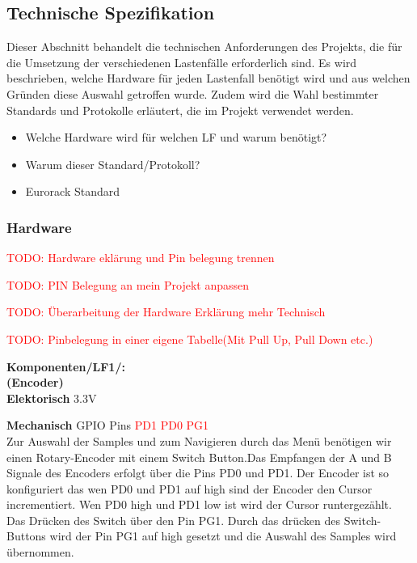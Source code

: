 \newpage
\subsection{Technische Spezifikation}
Dieser Abschnitt behandelt die technischen Anforderungen des Projekts, die für die Umsetzung der verschiedenen Lastenfälle erforderlich sind. Es wird beschrieben, welche Hardware für jeden Lastenfall benötigt wird und aus welchen Gründen diese Auswahl getroffen wurde. Zudem wird die Wahl bestimmter Standards und Protokolle erläutert, die im Projekt verwendet werden.

\begin{itemize}
    \item Welche Hardware wird für welchen LF und warum benötigt?
    \item Warum dieser Standard/Protokoll?
    \item Eurorack Standard
\end{itemize}


\subsubsection{Hardware}

\textcolor{red}{TODO: Hardware eklärung und Pin belegung trennen}

\textcolor{red}{TODO: PIN Belegung an mein Projekt anpassen}

\textcolor{red}{TODO: Überarbeitung der Hardware Erklärung mehr Technisch}

\textcolor{red}{TODO: Pinbelegung in einer eigene Tabelle(Mit Pull Up, Pull Down etc.)}

\textbf{Komponenten/LF1/:} \\


\textbf{(Encoder)} \\

\textbf{Elektorisch} 3.3V

\textbf{Mechanisch} GPIO Pins \textcolor{red}{PD1 PD0 PG1}
 \\

Zur Auswahl der Samples und zum Navigieren durch das Menü benötigen wir einen Rotary-Encoder mit einem Switch Button.Das Empfangen der A und B Signale des Encoders erfolgt über die Pins PD0 und PD1. Der Encoder ist so konfiguriert das wen PD0 und PD1 auf high sind der Encoder den Cursor incrementiert. Wen PD0 high und PD1 low ist wird der Cursor runtergezählt.
Das Drücken des Switch über den Pin PG1. Durch das drücken des Switch-Buttons wird der Pin PG1 auf high gesetzt und die Auswahl des Samples wird übernommen.

